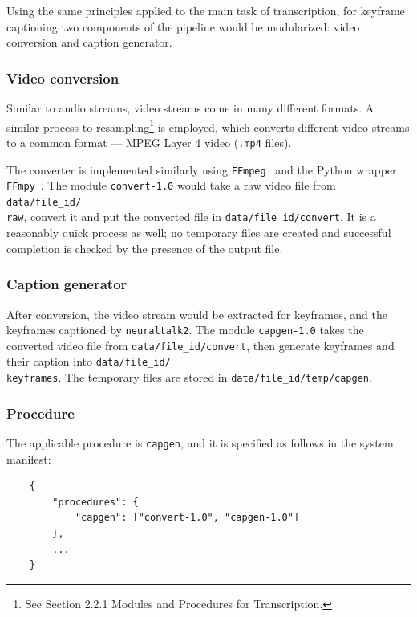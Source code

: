 Using the same principles applied to the main task of transcription, for keyframe
captioning two components of the pipeline would be modularized: video conversion
and caption generator.

\subsubsection{Video conversion}

Similar to audio streams, video streams come in many different formats. A similar
process to resampling\footnote{See Section 2.2.1 Modules and Procedures for
Transcription.} is employed, which converts different video streams to a common
format --- MPEG Layer 4 video (\texttt{.mp4} files).

The converter is implemented similarly using \texttt{FFmpeg}~\cite{ffmpeg} and the
Python wrapper \texttt{FFmpy}~\cite{ffmpy}. The module \texttt{convert-1.0} would
take a raw video file from \texttt{data/file\_id/\\ raw}, convert it and put the
converted file in \texttt{data/file\_id/convert}. It is a reasonably quick process
as well; no temporary files are created and successful completion is checked by the
presence of the output file.

\subsubsection{Caption generator}

After conversion, the video stream would be extracted for keyframes, and the 
keyframes captioned by \texttt{neuraltalk2}. The module \texttt{capgen-1.0} takes
the converted video file from \texttt{data/file\_id/convert}, then generate
keyframes and their caption into \texttt{data/file\_id/\\ keyframes}. The
temporary files are stored in \texttt{data/file\_id/temp/capgen}.

\subsubsection{Procedure}

The applicable procedure is \texttt{capgen}, and it is specified as follows in
the system manifest:

\begin{lstlisting}
    {
        "procedures": {
            "capgen": ["convert-1.0", "capgen-1.0"]
        },
        ...
    }
\end{lstlisting}

